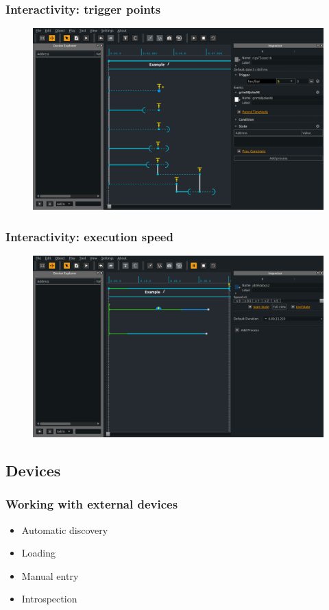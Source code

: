 \documentclass[handout]{beamer}
\begin{document}
\begin{frame}
\frametitle{Interactivity: trigger points}
\Large
\begin{figure}
    \includegraphics[width=\textwidth]{images/triggers.png}
\end{figure}
\end{frame}

\begin{frame}
\frametitle{Interactivity: execution speed}
\Large
\begin{figure}
    \includegraphics[width=\textwidth]{images/speed.png}
\end{figure}
\end{frame}

\subsection{Devices}
\begin{frame}
\frametitle{Working with external devices}
\Large
\begin{itemize}
    \item<1> Automatic discovery
    \item<2> Loading
    \item<3> Manual entry
    \item<4> Introspection
\end{itemize}
\end{frame}
\end{document}
